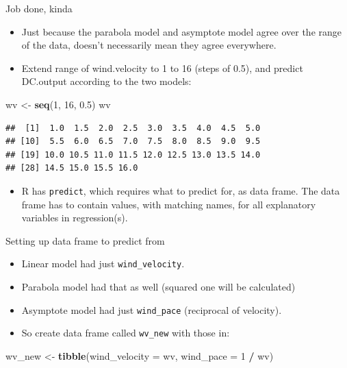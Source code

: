 \documentclass[ignorenonframetext,]{beamer}
\newenvironment{Shaded}{\begin{snugshade}}{\end{snugshade}}
\newcommand{\DataTypeTok}[1]{\textcolor[rgb]{0.13,0.29,0.53}{#1}}
\newcommand{\DecValTok}[1]{\textcolor[rgb]{0.00,0.00,0.81}{#1}}
\newcommand{\FloatTok}[1]{\textcolor[rgb]{0.00,0.00,0.81}{#1}}
\newcommand{\KeywordTok}[1]{\textcolor[rgb]{0.13,0.29,0.53}{\textbf{#1}}}
\newcommand{\NormalTok}[1]{#1}
\newcommand{\OperatorTok}[1]{\textcolor[rgb]{0.81,0.36,0.00}{\textbf{#1}}}
\newcommand{\StringTok}[1]{\textcolor[rgb]{0.31,0.60,0.02}{#1}}
\providecommand{\tightlist}{%
  \setlength{\itemsep}{0pt}\setlength{\parskip}{0pt}}
\begin{document}
\begin{frame}[fragile]{Job done, kinda}
\protect\hypertarget{job-done-kinda}{}

\begin{itemize}
\tightlist
\item
  Just because the parabola model and asymptote model agree over the
  range of the data, doesn't necessarily mean they agree everywhere.
\item
  Extend range of wind.velocity to 1 to 16 (steps of 0.5), and predict
  DC.output according to the two models:
\end{itemize}

\begin{Shaded}
\begin{Highlighting}[]
\NormalTok{wv <-}\StringTok{ }\KeywordTok{seq}\NormalTok{(}\DecValTok{1}\NormalTok{, }\DecValTok{16}\NormalTok{, }\FloatTok{0.5}\NormalTok{)}
\NormalTok{wv}
\end{Highlighting}
\end{Shaded}

\begin{verbatim}
##  [1]  1.0  1.5  2.0  2.5  3.0  3.5  4.0  4.5  5.0
## [10]  5.5  6.0  6.5  7.0  7.5  8.0  8.5  9.0  9.5
## [19] 10.0 10.5 11.0 11.5 12.0 12.5 13.0 13.5 14.0
## [28] 14.5 15.0 15.5 16.0
\end{verbatim}

\begin{itemize}
\tightlist
\item
  R has \texttt{predict}, which requires what to predict for, as data
  frame. The data frame has to contain values, with matching names, for
  all explanatory variables in regression(s).
\end{itemize}

\end{frame}

\begin{frame}[fragile]{Setting up data frame to predict from}
\protect\hypertarget{setting-up-data-frame-to-predict-from}{}

\begin{itemize}
\tightlist
\item
  Linear model had just \texttt{wind\_velocity}.
\item
  Parabola model had that as well (squared one will be calculated)
\item
  Asymptote model had just \texttt{wind\_pace} (reciprocal of velocity).
\item
  So create data frame called \texttt{wv\_new} with those in:
\end{itemize}

\begin{Shaded}
\begin{Highlighting}[]
\NormalTok{wv_new <-}\StringTok{ }\KeywordTok{tibble}\NormalTok{(}\DataTypeTok{wind_velocity =}\NormalTok{ wv, }\DataTypeTok{wind_pace =} \DecValTok{1} \OperatorTok{/}\StringTok{ }\NormalTok{wv)}
\end{Highlighting}
\end{Shaded}

\end{frame}
\end{document}

